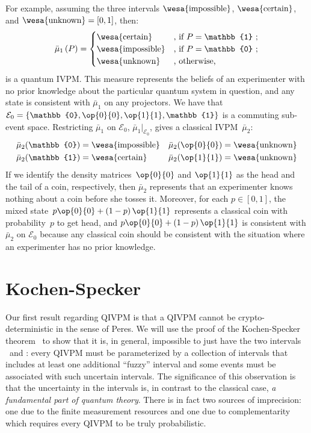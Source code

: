 \documentclass[english,reprint, aps, prl,superscriptaddress, showpacs,
showkeys, longbibliography, amsmath, amssymb]{revtex4-1}
\theoremstyle{plain}
\theoremstyle{definition}
\newcommand{\events}{\ensuremath{\mathcal{E}}}
\newcommand{\imposs}{{\text{\wesa{impossible}}}}
\newcommand{\necess}{{\text{\wesa{certain}}}}
\newcommand{\unknown}{{\text{\wesa{unknown}}}}
\newcommand{\proj}[1]{\op{#1}{#1}}
\begin{document}
For example, assuming the three intervals $\imposs$, $\necess$, and
$\unknown=\left[0,1\right]$, then:
\begin{equation}
\bar{\mu}_{1}\left(P\right)=\begin{cases}
\necess & \text{, if }P=\mathbb{1}\text{ ;}\\
\imposs & \text{, if }P=\mathbb{0}\text{ ;}\\
\unknown & \text{, otherwise,}
\end{cases}\label{eq:no-information-IVPM}
\end{equation}
is a quantum IVPM. This measure represents the beliefs of an
experimenter with no prior knowledge about the particular quantum
system in question, and any state is consistent with $\bar{\mu}_{1}$
on any projectors. We have that
$\events_{0}=\left\{ \mathbb{0},\proj{0},\proj{1},\mathbb{1}\right\} $
is a commuting sub-event space. Restricting $\bar{\mu}_{1}$ on
$\events_{0}$, $\bar{\mu}_{1}|_{\events_{0}}$, gives a classical
IVPM~$\bar{\mu}_{2}$:
\begin{equation}
\begin{aligned}\bar{\mu}_{2}(\mathbb{0}) & =\imposs & \bar{\mu}_{2}(\proj{0}) & =\unknown\\
\bar{\mu}_{2}(\mathbb{1}) & =\necess & \bar{\mu}_{2}(\proj{1}) & =\unknown
\end{aligned}
\end{equation}
If we identify the density matrices~$\proj{0}$ and $\proj{1}$ as
the head and the tail of a coin, respectively, then $\bar{\mu}_{2}$
represents that an experimenter knows nothing about a coin before
she tosses it. Moreover, for each $p\in\left[0,1\right]$, the mixed
state~$p\proj{0}+\left(1-p\right)\proj{1}$ represents a classical
coin with probability~$p$ to get head, and $p\proj{0}+\left(1-p\right)\proj{1}$
is consistent with $\bar{\mu}_{2}$ on $\events_{0}$ because any
classical coin should be consistent with the situation where an experimenter
has no prior knowledge.

\section{Kochen-Specker} 
  
Our first result regarding QIVPM is that a QIVPM cannot be
crypto-deterministic in the sense of Peres. We will use the proof of
the Kochen-Specker
theorem~\cite{kochenspecker1967,peres1995quantum,Redhead1987-REDINA,Griffiths2003}
to show that it is, in general, impossible to just have the two
intervals \imposs\ and \necess: every QIVPM must be parameterized by a
collection of intervals that includes at least one additional
``fuzzy'' interval and some events must be associated with such
uncertain intervals. The significance of this observation is that the
uncertainty in the intervals is, in contrast to the classical case,
\emph{a fundamental part of quantum theory}. There is in fact two
sources of imprecision: one due to the finite measurement resources
and one due to complementarity which requires every QIVPM to be truly
probabilistic.
\end{document}
